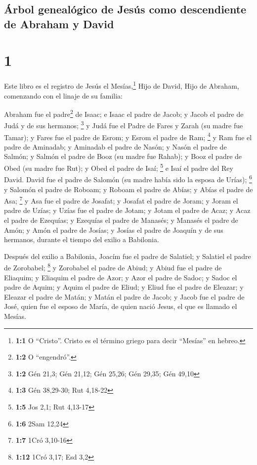 \hypertarget{uxe1rbol-genealuxf3gico-de-jesuxfas-como-descendiente-de-abraham-y-david}{%
\subsection{Árbol genealógico de Jesús como descendiente de Abraham y
David}\label{uxe1rbol-genealuxf3gico-de-jesuxfas-como-descendiente-de-abraham-y-david}}

\hypertarget{section}{%
\section{1}\label{section}}

 Este libro es el registro de Jesús el Mesías,\footnote{\textbf{1:1}
  O ``Cristo''. Cristo es el término griego para decir ``Mesías'' en
  hebreo.} Hijo de David, Hijo de Abraham, comenzando con el linaje de
su familia:

 Abraham fue el padre\footnote{\textbf{1:2} O
  ``engendró''.} de Isaac; e Isaac el padre de Jacob; y Jacob el padre
de Judá y de sus hermanos; \footnote{\textbf{1:2} Gén 21,3; Gén 21,12;
  Gén 25,26; Gén 29,35; Gén 49,10}  y Judá fue el Padre de
Fares y Zarah (su madre fue Tamar); y Fares fue el padre de Esrom; y
Esrom el padre de Ram; \footnote{\textbf{1:3} Gén 38,29-30; Rut 4,18-22}
 y Ram fue el padre de Aminadab; y Aminadab el padre de
Nasón; y Nasón el padre de Salmón;  y Salmón el padre de
Booz (su madre fue Rahab); y Booz el padre de Obed (su madre fue Rut); y
Obed el padre de Isaí; \footnote{\textbf{1:5} Jos 2,1; Rut 4,13-17}
 e Isaí el padre del Rey David. David fue el padre de
Salomón (su madre había sido la esposa de Urías); \footnote{\textbf{1:6}
  2Sam 12,24}  y Salomón el padre de Roboam; y Roboam el
padre de Abías; y Abías el padre de Asa; \footnote{\textbf{1:7} 1Cró
  3,10-16}  y Asa fue el padre de Josafat; y Josafat el
padre de Joram; y Joram el padre de Uzías;  y Uzías fue el
padre de Jotam; y Jotam el padre de Acaz; y Acaz el padre de Ezequías;
 y Ezequías el padre de Manasés; y Manasés el padre de
Amón; y Amón el padre de Josías;  y Josías el padre de
Joaquín y de sus hermanos, durante el tiempo del exilio a Babilonia.

 Después del exilio a Babilonia, Joacím fue el padre de
Salatiel; y Salatiel el padre de Zorobabel; \footnote{\textbf{1:12} 1Cró
  3,17; Esd 3,2}  y Zorobabel el padre de Abiud; y Abiud
fue el padre de Eliaquim; y Eliaquim el padre de Azor;  y
Azor el padre de Sadoc; y Sadoc el padre de Aquim; y Aquim el padre de
Eliud;  y Eliud fue el padre de Eleazar; y Eleazar el
padre de Matán; y Matán el padre de Jacob;  y Jacob fue
el padre de José, quien fue el esposo de María, de quien nació Jesus, el
que es llamado el Mesías.

